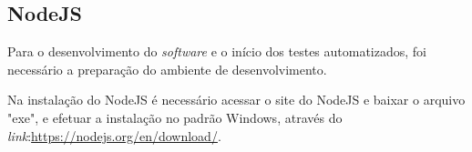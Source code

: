 \subsection{NodeJS}

\par Para o desenvolvimento do \textit{software} e o início dos testes automatizados, foi necessário a preparação do ambiente de desenvolvimento.

\par Na instalação do NodeJS é necessário acessar o site do NodeJS e baixar o arquivo "exe", e efetuar a instalação no padrão Windows,
através do \textit{link}:\url{https://nodejs.org/en/download/}. 

